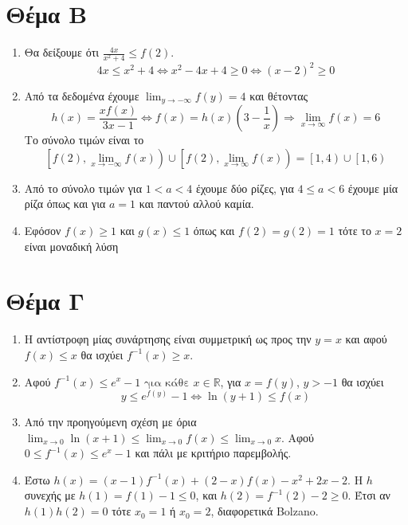 \documentclass[12pt]{article}
\begin{document}
\section*{Θέμα Β}
  \noindent
  \begin{enumerate}
    \item Θα δείξουμε ότι $\frac{4x}{x^2+4}\le f(2)$.
    $$4x\le x^2+4 \iff x^2-4x+4\ge 0 \iff (x-2)^2\ge 0$$
    \item Από τα δεδομένα έχουμε $\lim_{y\to -\infty}f(y)=4$ και θέτοντας
    $$h(x)=\frac{xf(x)}{3x-1} \iff f(x)=h(x)(3-\frac{1}{x}) \Rightarrow \lim_{x\to \infty}f(x)=6$$
    Το σύνολο τιμών είναι το
    $$\left[ f(2), \lim_{x\to -\infty}f(x) \right) \cup \left[ f(2), \lim_{x\to \infty}f(x) \right) = \left[1,4\right)\cup \left[1, 6\right)$$
    \item Από το σύνολο τιμών για $1< a < 4$ έχουμε δύο ρίζες, για $4 \le a < 6$ έχουμε μία ρίζα όπως και για $a=1$ και παντού αλλού καμία.
    \item Εφόσον $f(x)\ge 1$ και $g(x)\le 1$ όπως και $f(2)=g(2)=1$ τότε το $x=2$ είναι μοναδική λύση
  \end{enumerate}

\section*{Θέμα Γ}
  \noindent
  \begin{enumerate}
    \item Η αντίστροφη μίας συνάρτησης είναι συμμετρική ως προς την $y=x$ και αφού $f(x)\le x$ θα ισχύει $f^{-1}(x)\ge x$.
    \item Αφού $f^{-1}(x)\le e^x-1 \text{ για κάθε } x\in\mathbb{R}$, για $x=f(y)$, $y>-1$ θα ισχύει
    $$y\le e^{f(y)}-1 \iff \ln (y+1) \le f(x)$$
    \item Από την προηγούμενη σχέση με όρια $\lim_{x\to 0}\ln(x+1)\le \lim_{x\to 0} f(x) \le \lim_{x\to 0}x$. Αφού $0\le f^{-1}(x)\le e^x-1$ και πάλι με κριτήριο παρεμβολής.
    \item Έστω $h(x)=(x-1)f^{-1}(x)+(2-x)f(x)-x^2+2x-2$. Η $h$ συνεχής με $h(1)=f(1)-1\le 0$, και $h(2)=f^{-1}(2)-2\ge 0$. Έτσι αν $h(1)h(2)=0$ τότε $x_0=1$ ή $x_0=2$, διαφορετικά Bolzano.
  \end{enumerate}
\end{document}
